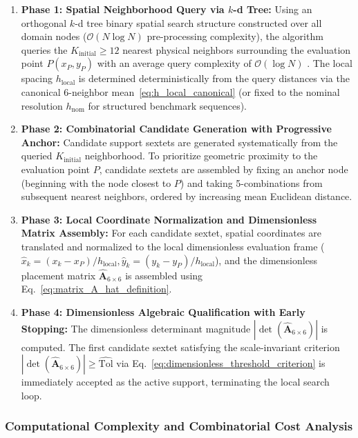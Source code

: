 \documentclass[preprint,12pt]{elsarticle}
\begin{document}
\begin{enumerate}
    \item \textbf{Phase 1: Spatial Neighborhood Query via $k$-d Tree:} Using an orthogonal $k$-d tree binary spatial search structure constructed over all domain nodes ($\mathcal{O}(N \log N)$ pre-processing complexity), the algorithm queries the $K_{\mathrm{initial}} \ge 12$ nearest physical neighbors surrounding the evaluation point $P(x_P, y_P)$ with an average query complexity of $\mathcal{O}(\log N)$ \cite{bentley1975multidimensional, parreira2006efficient, fasshauer2007meshfree,wu2026high}. The local spacing $h_{\mathrm{local}}$ is determined deterministically from the query distances via the canonical 6-neighbor mean~\eqref{eq:h_local_canonical} (or fixed to the nominal resolution $h_{\mathrm{nom}}$ for structured benchmark sequences).

    \item \textbf{Phase 2: Combinatorial Candidate Generation with Progressive Anchor:} Candidate support sextets are generated systematically from the queried $K_{\mathrm{initial}}$ neighborhood. To prioritize geometric proximity to the evaluation point $P$, candidate sextets are assembled by fixing an anchor node (beginning with the node closest to $P$) and taking 5-combinations from subsequent nearest neighbors, ordered by increasing mean Euclidean distance.

    \item \textbf{Phase 3: Local Coordinate Normalization and Dimensionless Matrix Assembly:} For each candidate sextet, spatial coordinates are translated and normalized to the local dimensionless evaluation frame ($\hat{x}_k = (x_k - x_P)/h_{\mathrm{local}}, \hat{y}_k = (y_k - y_P)/h_{\mathrm{local}}$), and the dimensionless placement matrix $\widehat{\mathbf{A}}_{6 \times 6}$ is assembled using Eq.~\eqref{eq:matrix_A_hat_definition}.

    \item \textbf{Phase 4: Dimensionless Algebraic Qualification with Early Stopping:} The dimensionless determinant magnitude $|\det(\widehat{\mathbf{A}}_{6\times6})|$ is computed. The first candidate sextet satisfying the scale-invariant criterion $|\det(\widehat{\mathbf{A}}_{6\times6})| \ge \widehat{\mathrm{Tol}}$ via Eq.~\eqref{eq:dimensionless_threshold_criterion} is immediately accepted as the active support, terminating the local search loop.
\end{enumerate}

\subsubsection{Computational Complexity and Combinatorial Cost Analysis}
\label{subsubsec:computational_complexity}
\end{document}
